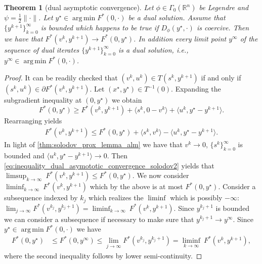\documentclass[11pt,onecolumn]{article}
\DeclareMathOperator*{\argmin}{arg\,min}
\DeclareMathOperator{\dom}{dom}
\newcommand{\bR}{\mathbb{R}}
\newtheorem{theorem}{Theorem}[section]
\theoremstyle{remark}
\begin{document}
\begin{theorem}[dual asymptotic convergence]\label{thm:dual_asymototic_convergence_solodov}
Let $\phi \in \Gamma_0(\bR^n)$ be Legendre and $\psi=\frac{1}{2}\|\cdot\|$. Let $y^\star \in \argmin F^*(0, \cdot)$ be a dual solution.
Assume that $\{y^{k+1}\}_{k=0}^\infty$ is bounded which happens to be true if $D_\phi(y^\star, \cdot)$ is coercive. Then we have that $F^*(v^k, y^{k+1}) \to F^*(0, y^\star)$. In addition every limit point $y^\infty$ of the sequence of dual iterates $\{y^{k+1}\}_{k=0}^\infty$ is a dual solution, i.e., $y^\infty \in \argmin F^*(0, \cdot)$.
\end{theorem}
\begin{proof}
It can be readily checked that $(v^{k},u^{k}) \in T(s^{k}, y^{k+1})$ if and only if $(s^k, u^k) \in \partial F^*(v^k, y^{k+1})$. 
Let $(x^\star, y^\star) \in T^{-1}(0)$. Expanding the subgradient inequality at $(0, y^\star)$ we obtain
$$
F^*(0, y^\star) \geq F^*(v^k, y^{k+1}) + \langle s^k, 0 - v^k\rangle + \langle u^k, y^\star- y^{k+1} \rangle.
$$
Rearranging yields
\begin{align} \label{eq:inequality_dual_asymototic_convergence_solodov2}
F^*(v^k,y^{k+1}) \leq F^*(0, y^\star) +\langle s^k, v^k\rangle - \langle u^k, y^\star- y^{k+1} \rangle.
\end{align}
In light of \cref{thm:solodov_prox_lemma_alm} we have that $v^k\to 0$, $\{s^k\}_{k=0}^\infty$ is bounded and $\langle u^k, y^\star- y^{k+1} \rangle \to 0$. Then \cref{eq:inequality_dual_asymototic_convergence_solodov2} yields that
$
\limsup_{k \to \infty} ~F^*(v^k,y^{k+1}) \leq F^*(0, y^\star).
$
We now consider $\liminf_{k \to \infty}~ F^*(v^k, y^{k+1})$ which by the above is at most $F^*(0, y^\star)$.
Consider a subsequence indexed by $k_j$ which realizes the $\liminf$ which is possibly $-\infty$: 
$
\lim_{j \to \infty} F^*(v^{k_j}, y^{k_j+1}) = \liminf_{k \to \infty}~ F^*(v^k, y^{k+1}).
$
Since $y^{k_j+1}$ is bounded we can consider a subsequence if necessary to make sure that $y^{k_j+1} \to y^\infty$. 
Since $y^\star \in \argmin F^*(0, \cdot)$ we have
\begin{align*}
F^*(0,y^\star) &\leq 
F^*(0, y^\infty) \leq \lim_{j \to \infty} F^*(v^{k_j}, y^{k_j+1})=
\liminf_{k \to \infty}~ F^*(v^k, y^{k+1}),%
\end{align*}
where the second inequality follows by lower semi-continuity.

\end{proof}
\end{document}
